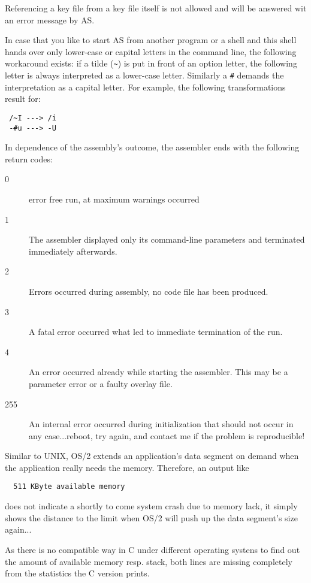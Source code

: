 \documentclass[12pt,twoside]{report}
\newcommand{\tty}[1]{{\tt #1}}
\newcommand{\asname}{{AS}}
\begin{document}
Referencing a key file from a key file itself is not allowed and will be
answered wit an error message by \asname{}.

In case that you like to start \asname{} from another program or a shell and
this shell hands over only lower-case or capital letters in the
command line, the following workaround exists: if a tilde (\verb!~!) is put
in front of an option letter, the following letter is always
interpreted as a lower-case letter.  Similarly a \tty{\#} demands the
interpretation as a capital letter.  For example, the following
transformations result for:
\begin{verbatim}
 /~I ---> /i
 -#u ---> -U
\end{verbatim}
In dependence of the assembly's outcome, the assembler ends with
the following return codes:
\begin{description}
\item[0]{error free run, at maximum warnings occurred}
\item[1]{The assembler displayed only its command-line parameters and
         terminated immediately afterwards.}
\item[2]{Errors occurred during assembly, no code file has been produced.}
\item[3]{A fatal error occurred what led to immediate termination of the run.}
\item[4]{An error occurred already while starting the assembler.
         This may be a parameter error or a faulty overlay file.}
\item[255]{An internal error occurred during initialization that should not
         occur in any case...reboot, try again, and contact me if the
         problem is reproducible!}
\end{description}
Similar to UNIX, OS/2  extends an application's data
segment on demand when the application really needs the memory.
Therefore, an output like
\begin{verbatim}
  511 KByte available memory
\end{verbatim}
does not indicate a shortly to come system crash due to memory lack,
it simply shows the distance to the limit when OS/2 will push up the
data segment's size again...

As there is no compatible way in C  under different
operating systens to find out the amount of available memory resp. stack,
both lines are missing completely from the statistics the C version prints.
\end{document}
